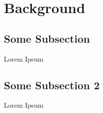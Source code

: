 \section{Background}

\subsection{Some Subsection}

Lorem Ipsum

\subsection{Some Subsection 2}

Lorem Ipsum

\newpage

